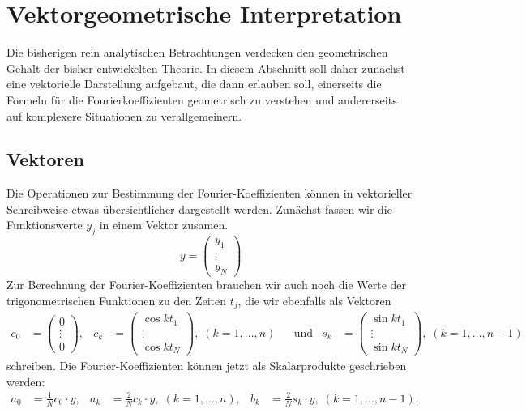 %
%
%
\section{Vektorgeometrische Interpretation}
Die bisherigen rein analytischen Betrachtungen verdecken den geometrischen
Gehalt der bisher entwickelten Theorie.
In diesem Abschnitt soll daher zunächst eine vektorielle Darstellung
aufgebaut, die dann erlauben soll, einerseits die Formeln für die 
Fourierkoeffizienten geometrisch zu verstehen und andererseits auf
komplexere Situationen zu verallgemeinern.

\subsection{Vektoren}
Die Operationen zur Bestimmung der Fourier-Koeffizienten können in 
vektorieller Schreibweise etwas übersichtlicher dargestellt werden.
Zunächst fassen wir die Funktionswerte $y_j$ in einem Vektor zusamen.
\begin{equation}
y = \begin{pmatrix}y_1\\\vdots\\y_N\end{pmatrix}
\end{equation}
Zur Berechnung der Fourier-Koeffizienten brauchen wir auch noch die
Werte der trigonometrischen Funktionen zu den Zeiten $t_j$, die wir
ebenfalls als Vektoren
\begin{align*}
c_0&=\begin{pmatrix}0\\\vdots\\0\end{pmatrix},
&
c_k&=\begin{pmatrix}\cos kt_1\\\vdots\\\cos kt_N\end{pmatrix},\;(k=1,\dots,n)
&&\text{und}
&
s_k&=\begin{pmatrix}\sin kt_1\\\vdots\\\sin kt_N\end{pmatrix},\;(k=1,\dots,n-1)
\end{align*}
schreiben.
Die Fourier-Koeffizienten können jetzt als Skalarprodukte geschrieben werden:
\begin{align*}
a_0 &=\frac1N c_0\cdot y,&
a_k &=\frac2N c_k\cdot y,\;(k=1,\dots,n),&
b_k &=\frac2N s_k\cdot y,\;(k=1,\dots,n-1).
\end{align*}

